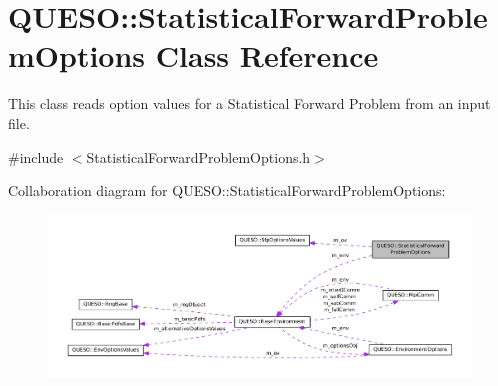 \hypertarget{class_q_u_e_s_o_1_1_statistical_forward_problem_options}{\section{Q\-U\-E\-S\-O\-:\-:Statistical\-Forward\-Problem\-Options Class Reference}
\label{class_q_u_e_s_o_1_1_statistical_forward_problem_options}
}


This class reads option values for a Statistical Forward Problem from an input file.  




{\ttfamily \#include $<$Statistical\-Forward\-Problem\-Options.\-h$>$}



Collaboration diagram for Q\-U\-E\-S\-O\-:\-:Statistical\-Forward\-Problem\-Options\-:
\nopagebreak
\begin{figure}[H]
\begin{center}
\leavevmode
\includegraphics[width=350pt]{class_q_u_e_s_o_1_1_statistical_forward_problem_options__coll__graph}
\end{center}
\end{figure}
